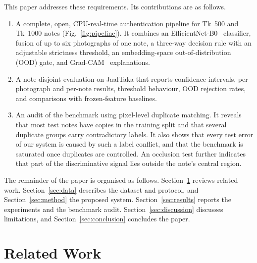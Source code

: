 \documentclass[journal]{IEEEtran}
\begin{document}
This paper addresses these requirements. Its contributions are as follows.
\begin{enumerate}
\item A complete, open, CPU-real-time authentication pipeline for Tk~500 and Tk~1000
notes (Fig.~\ref{fig:pipeline}). It combines an EfficientNet-B0~\cite{tan2019efficientnet}
classifier, fusion of up to six photographs of one note, a three-way decision rule with
an adjustable strictness threshold, an embedding-space out-of-distribution (OOD) gate,
and Grad-CAM~\cite{selvaraju2017gradcam} explanations.
\item A note-disjoint evaluation on JaalTaka that reports confidence intervals,
per-photograph and per-note results, threshold behaviour, OOD rejection rates, and
comparisons with frozen-feature baselines.
\item An audit of the benchmark using pixel-level duplicate matching. It reveals that
most test notes have copies in the training split and that several duplicate groups
carry contradictory labels. It also shows that every test error of our system is caused
by such a label conflict, and that the benchmark is saturated once duplicates are
controlled. An occlusion test further indicates that part of the discriminative signal
lies outside the note's central region.
\end{enumerate}

The remainder of the paper is organised as follows. Section~\ref{sec:related} reviews
related work. Section~\ref{sec:data} describes the dataset and protocol, and
Section~\ref{sec:method} the proposed system. Section~\ref{sec:results} reports the
experiments and the benchmark audit. Section~\ref{sec:discussion} discusses limitations,
and Section~\ref{sec:conclusion} concludes the paper.

\section{Related Work}
\label{sec:related}
\end{document}
